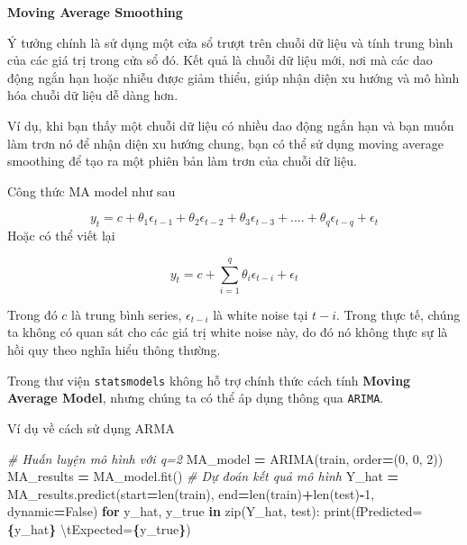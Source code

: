 \documentclass[
]{book}
\newenvironment{Shaded}{\begin{snugshade}}{\end{snugshade}}
\newcommand{\BuiltInTok}[1]{#1}
\newcommand{\CharTok}[1]{\textcolor[rgb]{0.31,0.60,0.02}{#1}}
\newcommand{\CommentTok}[1]{\textcolor[rgb]{0.56,0.35,0.01}{\textit{#1}}}
\newcommand{\ControlFlowTok}[1]{\textcolor[rgb]{0.13,0.29,0.53}{\textbf{#1}}}
\newcommand{\DecValTok}[1]{\textcolor[rgb]{0.00,0.00,0.81}{#1}}
\newcommand{\KeywordTok}[1]{\textcolor[rgb]{0.13,0.29,0.53}{\textbf{#1}}}
\newcommand{\NormalTok}[1]{#1}
\newcommand{\OperatorTok}[1]{\textcolor[rgb]{0.81,0.36,0.00}{\textbf{#1}}}
\newcommand{\SpecialCharTok}[1]{\textcolor[rgb]{0.81,0.36,0.00}{\textbf{#1}}}
\newcommand{\SpecialStringTok}[1]{\textcolor[rgb]{0.31,0.60,0.02}{#1}}
\newcommand{\VariableTok}[1]{\textcolor[rgb]{0.00,0.00,0.00}{#1}}
\renewenvironment{quote}{\begin{VF}}{\end{VF}}
\begin{document}
\textbf{Moving Average Smoothing}

\begin{quote}
Ý tưởng chính là sử dụng một cửa sổ trượt trên chuỗi dữ liệu và tính trung bình của các giá trị trong cửa sổ đó. Kết quả là chuỗi dữ liệu mới, nơi mà các dao động ngắn hạn hoặc nhiễu được giảm thiểu, giúp nhận diện xu hướng và mô hình hóa chuỗi dữ liệu dễ dàng hơn.
\end{quote}

\begin{quote}
Ví dụ, khi bạn thấy một chuỗi dữ liệu có nhiều dao động ngắn hạn và bạn muốn làm trơn nó để nhận diện xu hướng chung, bạn có thể sử dụng moving average smoothing để tạo ra một phiên bản làm trơn của chuỗi dữ liệu.
\end{quote}

Công thức MA model như sau

\[
y_t = c + \theta_1 \epsilon_{t-1} + \theta_2 \epsilon_{t-2} + \theta_3 \epsilon_{t-3} + .... + \theta_q \epsilon_{t-q} + \epsilon_t 
\]
Hoặc có thể viết lại

\[
y_t = c  + \sum^{q}_{i=1}\theta_{i}\epsilon_{t-i} +  \epsilon_t
\]

Trong đó \(c\) là trung bình series, \(\epsilon_{t-i}\) là white noise tại \(t-i\). Trong thực tế, chúng ta không có quan sát cho các giá trị white noise này, do đó nó không thực sự là hồi quy theo nghĩa hiểu thông thường.

Trong thư viện \texttt{statsmodels} không hỗ trợ chính thức cách tính \textbf{Moving Average Model}, nhưng chúng ta có thể áp dụng thông qua \texttt{ARIMA}.

Ví dụ về cách sử dụng ARMA

\begin{Shaded}
\begin{Highlighting}[]
\CommentTok{\# Huấn luyện mô hình với q=2}
\NormalTok{MA\_model }\OperatorTok{=}\NormalTok{ ARIMA(train, order}\OperatorTok{=}\NormalTok{(}\DecValTok{0}\NormalTok{, }\DecValTok{0}\NormalTok{, }\DecValTok{2}\NormalTok{))}
\NormalTok{MA\_results }\OperatorTok{=}\NormalTok{ MA\_model.fit()}
\CommentTok{\# Dự đoán kết quả mô hình}
\NormalTok{Y\_hat }\OperatorTok{=}\NormalTok{ MA\_results.predict(start}\OperatorTok{=}\BuiltInTok{len}\NormalTok{(train), end}\OperatorTok{=}\BuiltInTok{len}\NormalTok{(train)}\OperatorTok{+}\BuiltInTok{len}\NormalTok{(test)}\OperatorTok{{-}}\DecValTok{1}\NormalTok{, dynamic}\OperatorTok{=}\VariableTok{False}\NormalTok{)}
\ControlFlowTok{for}\NormalTok{ y\_hat, y\_true }\KeywordTok{in} \BuiltInTok{zip}\NormalTok{(Y\_hat, test):}
    \BuiltInTok{print}\NormalTok{(}\SpecialStringTok{f\textquotesingle{}Predicted=}\SpecialCharTok{\{}\NormalTok{y\_hat}\SpecialCharTok{\}}\SpecialStringTok{ }\CharTok{\textbackslash{}t}\SpecialStringTok{Expected=}\SpecialCharTok{\{}\NormalTok{y\_true}\SpecialCharTok{\}}\SpecialStringTok{\textquotesingle{}}\NormalTok{)}
\end{Highlighting}
\end{Shaded}
\end{document}
